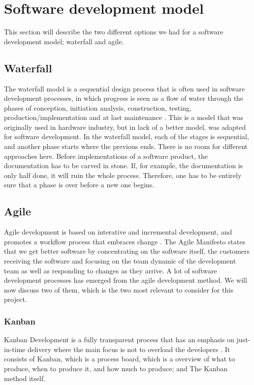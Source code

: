 \section{Software development model}

This section will describe the two different options we had for a software development model; waterfall and agile.

\subsection{Waterfall}
The waterfall model is a sequential design process that is often used in software development processes, in which progress is seen as a flow of water through the phases of conception, initiation analysis, construction, testing, production/implementation and at last maintenance \cite{bib:waterfall}. 
\newline
\newline
This is a model that was originally used in hardware industry, but in lack of a better model, was adapted for software development. In the waterfall model, each of the stages is sequential, and another phase starts where the previous ends. There is no room for different approaches here. Before implementations of a software product, the documentation has to be carved in stone. If, for example, the documentation is only half done, it will ruin the whole process. Therefore, one has to be entirely sure that a phase is over before a new one begins. 

\subsection{Agile}
Agile development is based on interative and incremental development, and promotes a workflow process that embraces change \cite{bib:agile}. The Agile Manifesto states that we get better software by concentrating on the software itself, the customers receiving the software and focusing on the team dynamic of the development team as well as responding to changes as they arrive. A lot of software development processes has emerged from the agile development method. We will now discuss two of them, which is the two most relevant to consider for this project. 

\subsubsection{Kanban}
Kanban Development is a fully transparent process that has an emphasis on just-in-time delivery where the main focus is not to overload the developers \cite{bib:kanban}. It consists of Kanban, which is a process board, which is a overview of what to produce, when to produce it, and how much to produce; and The Kanban method itself.

